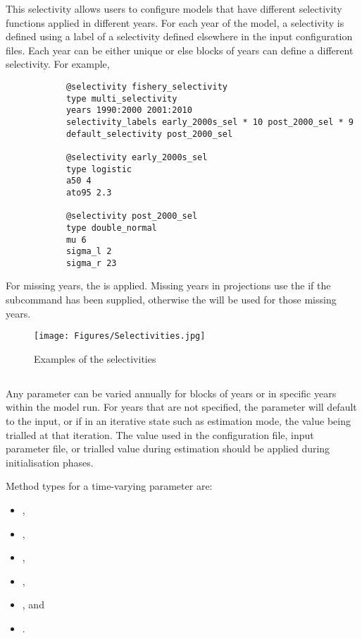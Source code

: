 This selectivity allows users to configure models that have different selectivity functions applied in different years. For each year of the model, a selectivity is defined using a label of a selectivity defined elsewhere in the input configuration files. Each year can be either unique or else blocks of years can define a different selectivity. For example,

{\small{\begin{verbatim}
			@selectivity fishery_selectivity
			type multi_selectivity
			years 1990:2000 2001:2010
			selectivity_labels early_2000s_sel * 10 post_2000_sel * 9
			default_selectivity post_2000_sel
			
			@selectivity early_2000s_sel
			type logistic
			a50 4
			ato95 2.3
			
			@selectivity post_2000_sel
			type double_normal
			mu 6
			sigma_l 2
			sigma_r 23
\end{verbatim}}}

For missing years, the  is applied. Missing years in projections use the  if the subcommand has been supplied, otherwise the  will be used for those missing years.

\begin{figure}[H]
	\centering
	\texttt{[image: Figures/Selectivities.jpg]}
	\caption{Examples of the selectivities}
	\label{fig:select examples}
\end{figure}

\subsection{}\label{sec:TimeVarying} 

Any parameter can be varied annually for blocks of years or in specific years within the model run. For years that are not specified, the parameter will default to the input, or if in an iterative state such as estimation mode, the value being trialled at that iteration. The value used in the configuration file, input parameter file, or trialled value during estimation should be applied during initialisation phases.

Method types for a time-varying parameter are:

\begin{itemize}
\item {},
\item {},
\item {},
\item {},
\item {}, and
\item {}.
\end{itemize}

